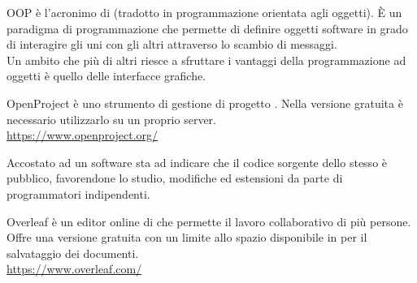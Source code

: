 
OOP è l'acronimo di  (tradotto in programmazione orientata agli oggetti). È un paradigma di programmazione che permette di definire oggetti software in grado di interagire gli uni con gli altri attraverso lo scambio di messaggi.\\
Un ambito che più di altri riesce a sfruttare i vantaggi della programmazione ad oggetti è quello delle interfacce grafiche.

OpenProject è uno strumento di gestione di progetto . Nella versione gratuita è necessario utilizzarlo su un proprio server.\\
\url{https://www.openproject.org/}

Accostato ad un software sta ad indicare che il codice sorgente dello stesso è pubblico, favorendone lo studio, modifiche ed estensioni da parte di programmatori indipendenti.

Overleaf è un editor online di  che permette il lavoro collaborativo di più persone. Offre una versione gratuita con un limite allo spazio disponibile in  per il salvataggio dei documenti.\\
\url{https://www.overleaf.com/}
\clearpage
